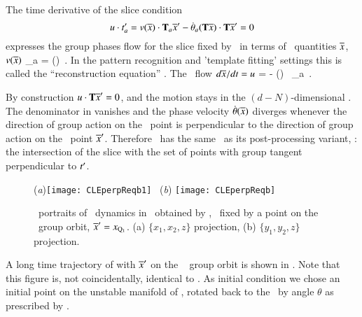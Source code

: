 The time derivative of the slice condition
\[
u \cdot t'_{a} =
v(\overline{x}) \cdot \mathbf{T}_a {\overline{x}'} -
\dot{{\bf \theta}}_a (\mathbf{T} \overline{x}) \cdot \mathbf{T} {\overline{x}'}
= 0
\]
expresses the group phases flow
for the slice fixed by \slicep\ in terms of
\reducedsp\ quantities $\overline{x}$, $v(\overline{x})$
\beq
\dot{\gSpace}_a = 
                       {(\Lg \sspRed) \cdot \Lg \slicep }
\,.
In the pattern recognition and 'template fitting' settings
this is called the ``reconstruction equation''%
.
The \reducedsp\ flow $d\overline{x}/dt = u$
\beq
\velRed = \vel - 
                         { (\Lg \sspRed) \cdot \Lg \slicep }
                 \, \Lg_a \sspRed
\,.

By construction $u \cdot \mathbf{T}
{\overline{x}'} = 0$, and  the motion stays in the
$(d\!-\!N)$-dimensional \slice. The denominator in
 vanishes and the phase velocity
$\dot{{\bf \theta}}(\overline{x})$ diverges whenever the direction of
group action on the \reducedsp\ point is perpendicular to the
direction of group action on the \slice\ point ${\overline{x}'}$.
Therefore \mslices\ has the same \sset\ as its
post-processing variant, \mframes: the intersection of the slice
with the set of points with group tangent perpendicular to $t'_{}$.

\begin{figure}[ht]
\begin{center}
 (\textit{a})\texttt{[image: CLEperpReqb1]}
~(\textit{b}) \texttt{[image: CLEperpReqb]}
\end{center}
\caption{
\Statesp\ portraits of \cLe\ dynamics  in \reducedsp\
obtained by {\Mframes}, \slice\ fixed by a point on the
\reqv\ group orbit, ${\overline{x}'}  = x_{\mathrm{Q}_{1}}$.
(a) $\{x_1,x_2,z\}$ projection,
(b) $\{y_1,y_2,z\}$ projection.
}
\label{fig:CLEpcSect}
\end{figure}
%
A long time trajectory of  with
${\overline{x}'}$ on the \reqv\  group orbit is shown in
. Note that this figure is, not coincidentally,
identical to \reffig{fig:CLEmfReqb1}.
As initial condition we chose an initial point on the unstable manifold
of \REQB{1}, rotated back to the \slice\ by angle $\theta$ as
prescribed by .

